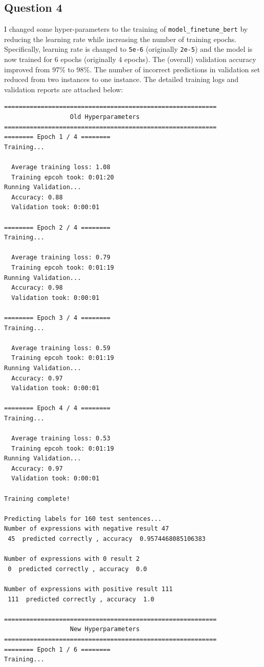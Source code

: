 \documentclass{article}
\begin{document}
\subsection{Question 4}
\par I changed some hyper-parameters to the training of \texttt{model\_finetune\_bert} by reducing the learning rate while increasing the number of training epochs. Specifically, learning rate is changed to \texttt{5e-6} (originally \texttt{2e-5}) and the model is now trained for 6 epochs (originally 4 epochs). The (overall) validation accuracy improved from 97\% to 98\%. The number of incorrect predictions in validation set reduced from two instances to one instance. The detailed training logs and validation reports are attached below:
\begin{lstlisting}
==========================================================
				  Old Hyperparameters
==========================================================
======== Epoch 1 / 4 ========
Training...

  Average training loss: 1.08
  Training epcoh took: 0:01:20
Running Validation...
  Accuracy: 0.88
  Validation took: 0:00:01

======== Epoch 2 / 4 ========
Training...

  Average training loss: 0.79
  Training epcoh took: 0:01:19
Running Validation...
  Accuracy: 0.98
  Validation took: 0:00:01

======== Epoch 3 / 4 ========
Training...

  Average training loss: 0.59
  Training epcoh took: 0:01:19
Running Validation...
  Accuracy: 0.97
  Validation took: 0:00:01

======== Epoch 4 / 4 ========
Training...

  Average training loss: 0.53
  Training epcoh took: 0:01:19
Running Validation...
  Accuracy: 0.97
  Validation took: 0:00:01

Training complete!

Predicting labels for 160 test sentences...
Number of expressions with negative result 47 
 45  predicted correctly , accuracy  0.9574468085106383 

Number of expressions with 0 result 2 
 0  predicted correctly , accuracy  0.0 

Number of expressions with positive result 111 
 111  predicted correctly , accuracy  1.0 

==========================================================
				  New Hyperparameters
==========================================================
======== Epoch 1 / 6 ========
Training...


\end{lstlisting}
\end{document}
